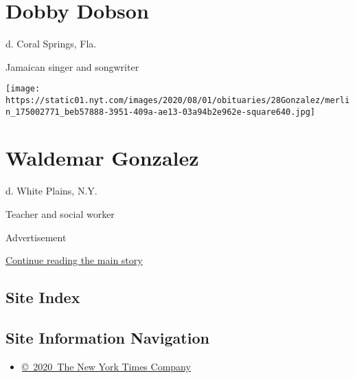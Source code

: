 \hypertarget{dobby-dobson}{%
\section{Dobby Dobson}\label{dobby-dobson}}

d. Coral Springs, Fla.

Jamaican singer and songwriter

\texttt{[image: https://static01.nyt.com/images/2020/08/01/obituaries/28Gonzalez/merlin\_175002771\_beb57888-3951-409a-ae13-03a94b2e962e-square640.jpg]}

\hypertarget{waldemar-gonzalez}{%
\section{Waldemar Gonzalez}\label{waldemar-gonzalez}}

d. White Plains, N.Y.

Teacher and social worker

Advertisement

\protect\hyperlink{after-bottom}{Continue reading the main story}

\hypertarget{site-index}{%
\subsection{Site Index}\label{site-index}}

\hypertarget{site-information-navigation}{%
\subsection{Site Information
Navigation}\label{site-information-navigation}}

\begin{itemize}
\tightlist
\item
  \href{https://help.nytimes.com/hc/en-us/articles/115014792127-Copyright-notice}{©~2020~The
  New York Times Company}
\end{itemize}

